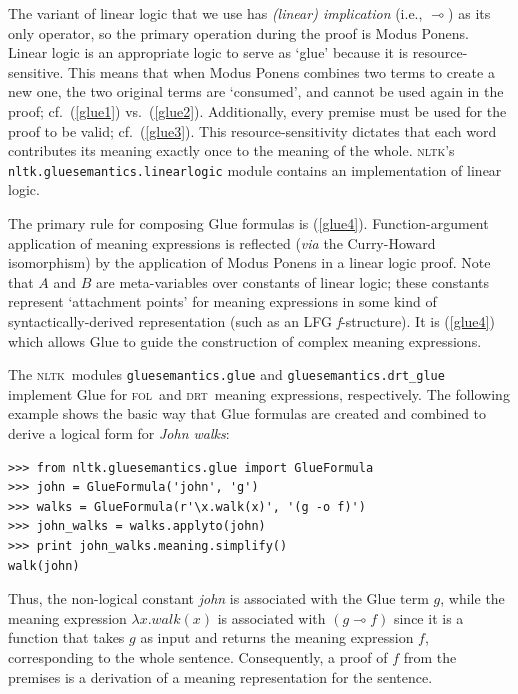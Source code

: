 \documentclass[11pt, a4paper]{article}
\newcommand{\DRT}{\textsc{drt}}
\newcommand{\FOL}{\textsc{fol}}
\newcommand{\NLTK}{\textsc{nltk}}
\begin{document}
The variant of linear logic that we use has \emph{(linear)
  implication} (i.e., $\multimap$)  as its
only operator, so the primary operation during the proof is Modus
Ponens.  Linear logic is an appropriate logic to serve as `glue'
because it is resource-sensitive.  This means that when Modus Ponens
combines two terms to create a new one, the two original
terms are `consumed', and cannot be used again in the proof;
cf.\ (\ref{glue1}) vs.\ (\ref{glue2}).
Additionally, every premise must be used for the proof to be valid;
cf.\ (\ref{glue3}).
This resource-sensitivity dictates that each word contributes its
meaning exactly once to the meaning of the whole.
\newpage
{}
\NLTK's \texttt{nltk.gluesemantics.linearlogic} module
contains an implementation of linear logic. 

The primary rule for composing Glue formulas is (\ref{glue4}).
Function-argument application of meaning expressions is reflected (\textit{via}
the Curry-Howard isomorphism) by the application of Modus Ponens in a
linear logic proof. Note that $A$ and $B$ are meta-variables over
constants of linear logic; these constants represent `attachment
points' for meaning expressions in some kind of syntactically-derived
representation (such as an LFG \textit{f}-structure).  It is
(\ref{glue4}) which allows Glue to guide the construction of complex
meaning expressions.  
\vspace{-3ex}

The \NLTK\ modules \texttt{gluesemantics.glue} and
\texttt{gluesemantics.drt\_glue} implement Glue for \FOL\ and
\DRT\ meaning expressions, respectively.
The following example shows the basic way that
Glue formulas are created and combined to derive a logical form for
\textit{John walks}: 

\begin{Verbatim}
>>> from nltk.gluesemantics.glue import GlueFormula
>>> john = GlueFormula('john', 'g')
>>> walks = GlueFormula(r'\x.walk(x)', '(g -o f)')
>>> john_walks = walks.applyto(john)
>>> print john_walks.meaning.simplify()
walk(john)
\end{Verbatim}
Thus, the non-logical constant \textit{john} is associated with the
Glue term $g$, while the meaning expression $\lambda x.walk(x)$ is
associated with $(g \multimap f)$ since it is a function that
takes $g$ as input and returns the meaning expression $f$,
corresponding to the whole
sentence.  Consequently, a proof of $f$ from the premises is a derivation
of a meaning representation for the sentence.
\end{document}
